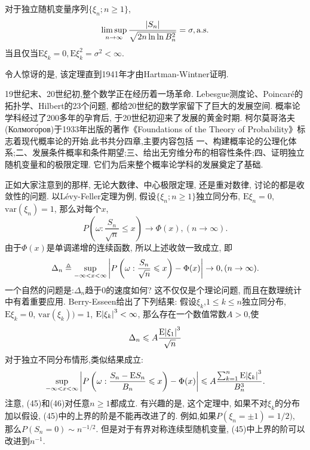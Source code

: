 \documentclass[a4paper,AutoFakeBold,oneside,12pt]{article}
\begin{document}
对于独立随机变量序列$\{\xi_n;n\geqslant 1\}$,\begin{equation}
    \limsup_{n\to\infty}\frac{\abs{S_n}}{\sqrt{2n\ln\ln B_n^2}} = \sigma,\mathrm{a.s.}
\end{equation}
当且仅当$\mathrm{E}\xi_k = 0,\mathrm{E}\xi_k^2 = \sigma^2<\infty$.

令人惊讶的是, 该定理直到1941年才由Hartman-Wintner证明.

19世纪末、20世纪初,整个数学正在经历着一场革命. Lebesgue测度论、Poincaré的拓扑学、Hilbert的23个问题, 都给20世纪的数学家留下了巨大的发展空间. 概率论学科经过了200多年的孕育后, 于20世纪初迎来了发展的黄金时期. 柯尔莫哥洛夫(Колмого́ров)于1933年出版的著作《Foundations of the Theory of Probability》标志着现代概率论的开始.此书共分四章,主要内容包括
一、构建概率论的公理化体系;二、发展条件概率和条件期望;三、给出无穷维分布的相容性条件;四、证明独立随机变量和的极限定理. 它们为后来整个概率论学科的发展奠定了基础.

正如大家注意到的那样, 无论大数律、中心极限定理, 还是重对数律, 讨论的都是收敛性的问题. 以Lévy-Feller定理为例, 假设$\{\xi_n;n\geqslant 1\}$独立同分布, $\mathrm{E}\xi_n = 0$,$\mathrm{var}(\xi_n) = 1$, 那么对每个$x$,\begin{equation}
    P\left( \omega:\frac{S_n}{\sqrt{n}}\leqslant x \right)\to\Phi(x), (n\to\infty).
\end{equation}
由于$\Phi(x)$是单调递增的连续函数, 所以上述收敛一致成立, 即\begin{equation}
    \Delta_n\triangleq \sup_{-\infty<x<\infty}\abs{P\left( \omega:\frac{S_n}{\sqrt{n}}\leqslant x \right)-\Phi(x)}\to 0,(n\to\infty).
\end{equation}
一个自然的问题是:$\Delta_n$趋于0的速度如何? 这不仅仅是个理论问题, 而且在数理统计中有着重要应用. Berry-Esseen给出了下列结果: 假设$\xi_k$,$1\leqslant k\leqslant n$独立同分布, $\mathrm{E}\xi_k = 0$, $\mathrm{var}(\xi_k)) = 1$, $\mathrm{E}\abs{\xi_k}^3<\infty$, 那么存在一个数值常数$A>0$,使\begin{equation}
    \Delta_n\leqslant A\frac{\mathrm{E}\abs{\xi_1}^3}{\sqrt{n}}
\end{equation}
对于独立不同分布情形,类似结果成立:
\begin{equation}
    \sup_{-\infty<x<\infty}\abs{P\left( \omega:\frac{S_n-\mathrm{E}S_n}{B_n}\leqslant x \right)-\Phi(x)}\leqslant A\frac{\sum_{k=1}^n\mathrm{E}\abs{\xi_k}^3}{B_n^3}.
\end{equation}
注意, (45)和(46)对任意$n\geqslant 1$都成立. 有兴趣的是, 这个定理中, 如果不对$\xi_k$的分布加以假设, (45)中的上界的阶是不能再改进了的. 例如,如果$P(\xi_n = \pm 1)=1/2)$, 那么$P(S_n = 0) \sim n^{-1/2}$. 但是对于有界对称连续型随机变量, (45)中上界的阶可以改进到$n^{-1}$.
\end{document}
